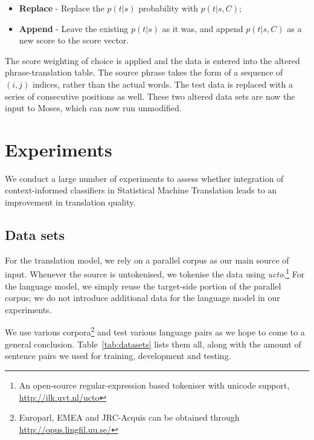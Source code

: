 \documentclass[smallextended]{svjour3}       %
\theoremstyle{break}
\begin{document}
\begin{itemize}
  \item \textbf{Replace} - Replace the $p(t|s)$ probability with $p(t|s,C)$;
  \item \textbf{Append} - Leave the existing $p(t|s)$ as it was, and append
    $p(t|s,C)$ as a new score to the score vector.
\end{itemize}

The score weighting of choice is applied and the data is entered into the
altered phrase-translation table. The source phrase takes the form of a
sequence of $(i,j)$ indices, rather than the actual words. The test data is
replaced with a series of consecutive positions as well. These two altered data
sets are now the input to Moses, which can now run unmodified. 

\section{Experiments}

We conduct a large number of experiments to assess whether integration of
context-informed classifiers in Statistical Machine Translation leads to
an improvement in translation quality. 


\subsection{Data sets}

For the translation model, we rely on a parallel corpus as our main source of
input. Whenever the source is untokenised, we tokenise the data using
\emph{ucto}.\footnote{An open-source regular-expression based tokeniser with
unicode support, \url{http://ilk.uvt.nl/ucto}} For the language model, we
simply reuse the target-side portion of the parallel corpus; we do not
introduce additional data for the language model in our experiments.

We use various corpora\footnote{Europarl, EMEA and JRC-Acquis can be obtained through
\url{http://opus.lingfil.uu.se/}} and test various language pairs as we hope to
come to a general conclusion. Table~\ref{tab:datasets} lists them all, along with the amount of
sentence pairs we used for training, development and testing.
\end{document}

